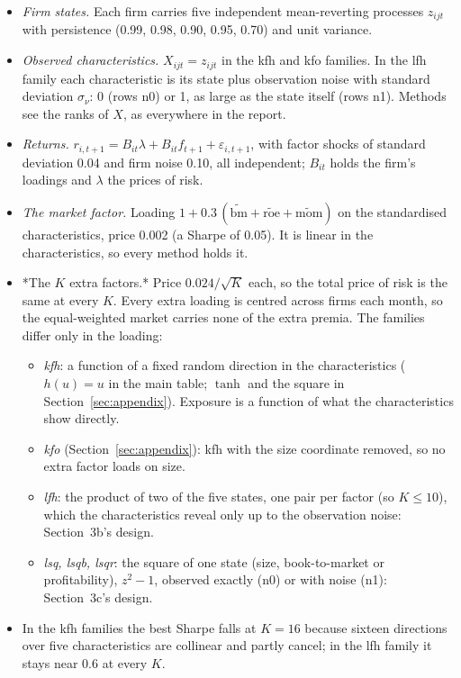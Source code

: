 \documentclass[11pt]{article}
\begin{document}
\begin{itemize}
\item \emph{Firm states.} Each firm carries five independent mean-reverting processes $z_{ijt}$ with persistence (0.99, 0.98, 0.90, 0.95, 0.70) and unit variance.
\item \emph{Observed characteristics.} $X_{ijt} = z_{ijt}$ in the kfh and kfo families. In the lfh family each characteristic is its state plus observation noise with standard deviation $\sigma_\nu$: 0 (rows n0) or 1, as large as the state itself (rows n1). Methods see the ranks of $X$, as everywhere in the report.
\item \emph{Returns.} $r_{i,t+1} = B_{it}\lambda + B_{it} f_{t+1} + \varepsilon_{i,t+1}$, with factor shocks of standard deviation 0.04 and firm noise 0.10, all independent; $B_{it}$ holds the firm's loadings and $\lambda$ the prices of risk.
\item \emph{The market factor.} Loading $1 + 0.3\,(\tilde{\mathrm{bm}} + \tilde{\mathrm{roe}} + \tilde{\mathrm{mom}})$ on the standardised characteristics, price 0.002 (a Sharpe of 0.05). It is linear in the characteristics, so every method holds it.
\item *The $K$ extra factors.* Price $0.024/\sqrt{K}$ each, so the total price of risk is the same at every $K$. Every extra loading is centred across firms each month, so the equal-weighted market carries none of the extra premia. The families differ only in the loading:
\begin{itemize}
\item \emph{kfh}: a function of a fixed random direction in the characteristics ($h(u) = u$ in the main table; $\tanh$ and the square in Section~\ref{sec:appendix}). Exposure is a function of what the characteristics show directly.
\item \emph{kfo} (Section~\ref{sec:appendix}): kfh with the size coordinate removed, so no extra factor loads on size.
\item \emph{lfh}: the product of two of the five states, one pair per factor (so $K \le 10$), which the characteristics reveal only up to the observation noise: Section~3b's design.
\item \emph{lsq, lsqb, lsqr}: the square of one state (size, book-to-market or profitability), $z^2 - 1$, observed exactly (n0) or with noise (n1): Section~3c's design.
\end{itemize}
\item In the kfh families the best Sharpe falls at $K = 16$ because sixteen directions over five characteristics are collinear and partly cancel; in the lfh family it stays near 0.6 at every $K$.
\end{itemize}

\end{document}
